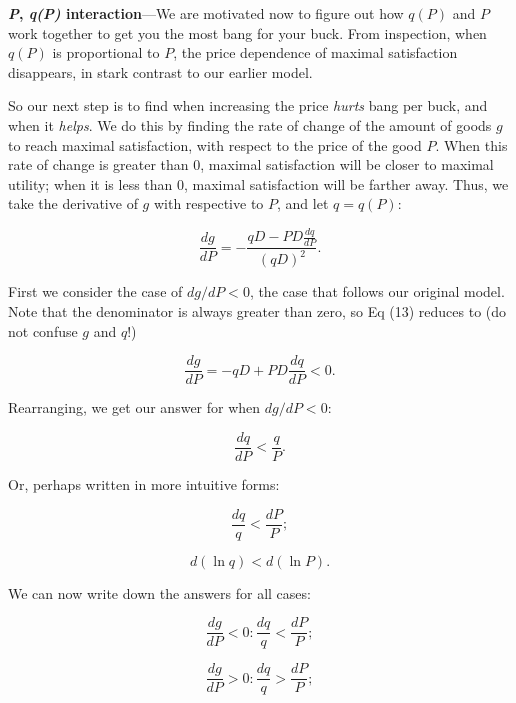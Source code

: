 \documentclass[11pt]{article}
\begin{document}
\vspace{16pt}
\textbf{\textit{P}, \textit{q(P)} interaction}---We are motivated now to figure out how $q(P)$ and $P$ work together to get you the most bang for your buck. From inspection, when $q(P)$ is proportional to $P$, the price dependence of maximal satisfaction disappears, in stark contrast to our earlier model.

So our next step is to find when increasing the price \textit{hurts} bang per buck, and when it \textit{helps}. We do this by finding the rate of change of the amount of goods $g$ to reach maximal satisfaction, with respect to the price of the good $P$. When this rate of change is greater than 0, maximal satisfaction will be closer to maximal utility; when it is less than 0, maximal satisfaction will be farther away. Thus, we take the derivative of $g$ with respective to $P$, and let $q = q(P)$:

\begin{equation}
	\frac{dg}{dP} = - \frac{qD - PD \frac{dq}{dP}}{(qD)^2}.
\end{equation}

First we consider the case of $dg/dP < 0$, the case that follows our original model. Note that the denominator is always greater than zero, so Eq (13) reduces to (do not confuse $g$ and $q$!)

\begin{equation}
	\frac{dg}{dP} = - qD + PD \frac{dq}{dP} < 0.
\end{equation}

Rearranging, we get our answer for when $dg/dP < 0$:

\begin{equation}
	\frac{dq}{dP} < \frac{q}{P}.
\end{equation}

Or, perhaps written in more intuitive forms:

\begin{equation}
	\frac{dq}{q} < \frac{dP}{P};
\end{equation}

\begin{equation}
	d(\ln q) < d(\ln P).
\end{equation}

We can now write down the answers for all cases:

\begin{equation}
	\frac{dg}{dP} < 0: \frac{dq}{q} < \frac{dP}{P};
\end{equation}

\begin{equation}
	\frac{dg}{dP} > 0: \frac{dq}{q} > \frac{dP}{P};
\end{equation}
\end{document}

